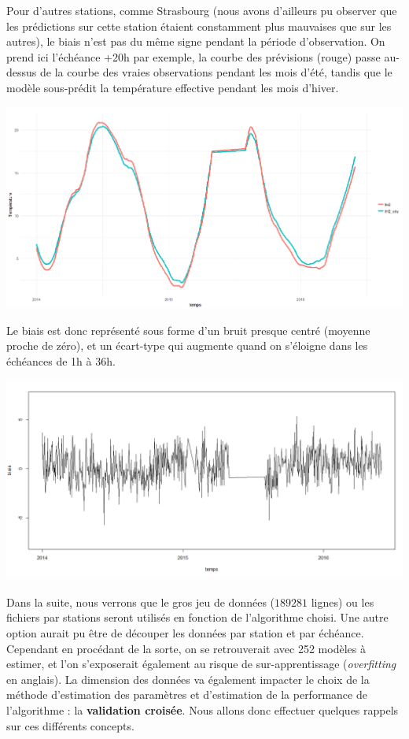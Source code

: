 \documentclass[14pt, openany]{article}
\begin{document}
Pour d'autres stations, comme Strasbourg (nous avons d'ailleurs pu observer que les prédictions sur cette station étaient constamment plus mauvaises que sur les autres), le biais n'est pas du même signe pendant la période d'observation. On prend ici l'échéance +20h par exemple, la courbe des prévisions (rouge) passe au-dessus de la courbe des vraies observations pendant les mois d'été, tandis que le modèle sous-prédit la température effective pendant les mois d'hiver.
\begin{center}
\includegraphics[width=17cm]{Images/biais_stras.png}
\end{center}
Le biais est donc représenté sous forme d'un bruit presque centré (moyenne proche de zéro), et un écart-type qui augmente quand on s'éloigne dans les échéances de 1h à 36h.
\begin{center}
\includegraphics[width=17cm]{Images/bias.png}
\end{center}
\paragraph{}
Dans la suite, nous verrons que le gros jeu de données ($189281$ lignes) ou les fichiers par stations seront utilisés en fonction de l'algorithme choisi. Une autre option aurait pu être de découper les données par station et par échéance. Cependant en procédant de la sorte, on se retrouverait avec 252 modèles à estimer, et l'on s'exposerait également au risque de sur-apprentissage (\textit{overfitting} en anglais). La dimension des données va également impacter le choix de la méthode d'estimation des paramètres et d'estimation de la performance de l'algorithme : la \textbf{validation croisée}. Nous allons donc effectuer quelques rappels sur ces différents concepts.
\end{document}
